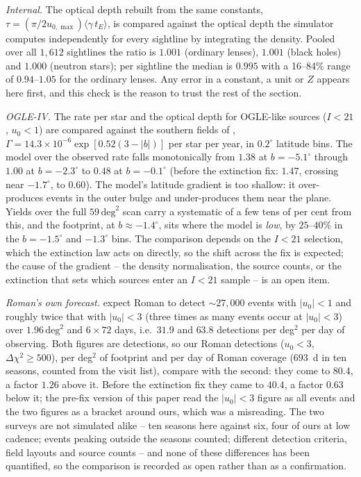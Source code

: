 \documentclass[english,10pt,a4paper]{article}
\begin{document}
	\emph{Internal.} The optical depth rebuilt from the same constants, $\tau = (\pi/2u_{0,\max})\langle\gamma\,t_E\rangle$, is compared against the optical depth the simulator computes independently for every sightline by integrating the density. Pooled over all $1{,}612$ sightlines the ratio is $1.001$ (ordinary lenses), $1.001$ (black holes) and $1.000$ (neutron stars); per sightline the median is $0.995$ with a 16--84\% range of $0.94$--$1.05$ for the ordinary lenses. Any error in a constant, a unit or $Z$ appears here first, and this check is the reason to trust the rest of the section.

	\emph{OGLE-IV.} The rate per star and the optical depth for OGLE-like sources ($I<21$, $u_0<1$) are compared against the southern fields of \cite{Mroz2019OGLEIV}, $\Gamma = 14.3\times10^{-6}\exp[0.52(3-|b|)]$ per star per year, in $0.2^\circ$ latitude bins. The model over the observed rate falls monotonically from $1.38$ at $b=-5.1^\circ$ through $1.00$ at $b=-2.3^\circ$ to $0.48$ at $b=-0.1^\circ$ (before the extinction fix: $1.47$, crossing near $-1.7^\circ$, to $0.60$). The model's latitude gradient is too shallow: it over-produces events in the outer bulge and under-produces them near the plane. Yields over the full $59\,\mathrm{deg}^2$ scan carry a systematic of a few tens of per cent from this, and the footprint, at $b\approx-1.4^\circ$, sits where the model is \emph{low}, by $25$--$40\%$ in the $b=-1.5^\circ$ and $-1.3^\circ$ bins. The comparison depends on the $I<21$ selection, which the extinction law acts on directly, so the shift across the fix is expected; the cause of the gradient -- the density normalisation, the source counts, or the extinction that sets which sources enter an $I<21$ sample -- is an open item.

	\emph{Roman's own forecast.} \cite{penny2019predictions} expect Roman to detect $\sim27{,}000$ events with $|u_0|<1$ and roughly twice that with $|u_0|<3$ (three times as many events occur at $|u_0|<3$) over $1.96\,\mathrm{deg}^2$ and $6\times72$ days, i.e.\ $31.9$ and $63.8$ detections per deg$^2$ per day of observing. Both figures are detections, so our Roman detections ($u_0<3$, $\Delta\chi^2\ge500$), per deg$^2$ of footprint and per day of Roman coverage ($693$~d in ten seasons, counted from the visit list), compare with the second: they come to $80.4$, a factor $1.26$ above it. Before the extinction fix they came to $40.4$, a factor $0.63$ below it; the pre-fix version of this paper read the $|u_0|<3$ figure as all events and the two figures as a bracket around ours, which was a misreading. The two surveys are not simulated alike -- ten seasons here against six, four of ours at low cadence; events peaking outside the seasons counted; different detection criteria, field layouts and source counts -- and none of these differences has been quantified, so the comparison is recorded as open rather than as a confirmation.
\end{document}
